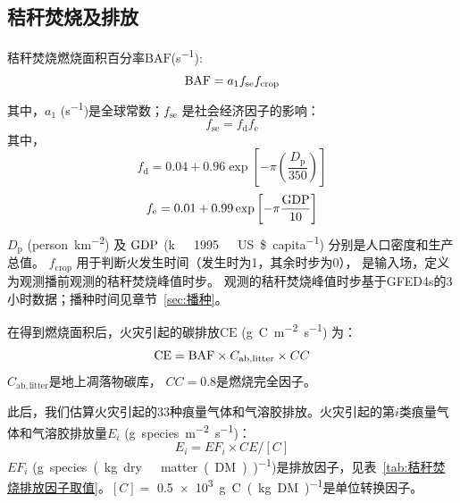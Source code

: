 \subsection{秸秆焚烧及排放}
秸秆焚烧燃烧面积百分率${\mathrm {BAF}}$(\unit{s^{-1}}):
\begin{equation}
  {\rm BAF}= a_1 f_{\mathrm{se}} f_{\mathrm{crop}}
\end{equation}
其中，$a_1$ (\unit{s^{-1}})是全球常数；$f_{\mathrm{se}}$ 是社会经济因子的影响：
\begin{equation}
  f_{\mathrm{se}} = f_{\mathrm {d}}  f_{\mathrm {e}}
\end{equation}
其中，
\begin{equation}
  f_{\mathrm {d}}  = 0.04 + 0.96\exp\left[-\pi\left(\frac{D_{\mathrm {p}} }{350}\right)\right]
\end{equation}
\begin{equation}
  f_{\mathrm {e}}  = 0.01 + 0.99\exp\left[-\pi\frac{\rm GDP}{10}\right]
\end{equation}
$D_{\mathrm {p}} $ (\unit{person.km^{-2}}) 及 ${\mathrm {\rm GDP}}$ (\unit{k\ 1995\ US\$.capita^{-1}})
分别是人口密度和生产总值。
$f_{\mathrm{crop}}$ 用于判断火发生时间（发生时为1，其余时步为0），
是输入场，定义为观测播前观测的秸秆焚烧峰值时步。
观测的秸秆焚烧峰值时步基于GFED4s的3小时数据；播种时间见章节~\ref{sec:播种}。

在得到燃烧面积后，火灾引起的碳排放${\mathrm {CE}}$ (\unit{g.C.m^{-2}.s^{-1}}) 为：
\begin{equation}
  {\rm CE}={\rm BAF} \times C_{\mathrm{ab,litter}} \times CC
\end{equation}
$C_{\mathrm{ab,litter}}$是地上凋落物碳库， $CC=0.8$是燃烧完全因子。

此后，我们估算火灾引起的33种痕量气体和气溶胶排放。火灾引起的第$i$类痕量气体和气溶胶排放量$E_i$ (\unit{g.species.m^{-2}.s^{-1}})：
\begin{equation}
  E_{i}=EF_{i} \times CE /[{C}]
\end{equation}
$EF_i$ (\unit{g.species.(kg.dry\ matter(DM))^{-1}})是排放因子，见表~\ref{tab:秸秆焚烧排放因子取值}。$[C]=$ \qty{0.5e3}{g.C.(kg.DM)^{-1}}是单位转换因子。


